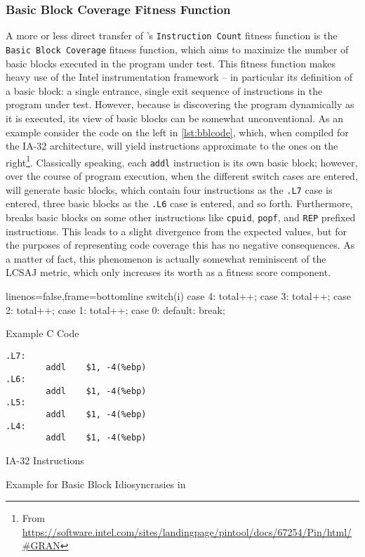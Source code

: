 \subsubsection{Basic Block Coverage Fitness Function}
A more or less direct transfer of \evosuite's \texttt{Instruction Count} fitness function is the 
\texttt{Basic Block Coverage} fitness function, which aims to maximize the number of basic blocks 
executed in the program under test. This fitness function makes heavy use of the {\small Intel} \pin
instrumentation framework -- in particular its definition of a basic block: a single entrance, 
single exit sequence of instructions in the program under test. However, because \pin is discovering the 
program dynamically as it is executed, its view of basic blocks can be somewhat unconventional. As an 
example consider the code on the left in \cref{lst:bblcode}, which, when compiled for the IA-32 
architecture, will yield instructions approximate to the ones on the 
right\footnote{From \url{https://software.intel.com/sites/landingpage/pintool/docs/67254/Pin/html/\#GRAN}}.
Classically speaking, each \texttt{addl} instruction is its own basic block; however, over the course
of program execution, when the different switch cases are entered, \pin will generate basic blocks, which
contain four instructions as the \texttt{.L7} case is entered, three basic blocks as the \texttt{.L6}
case is entered, and so forth. Furthermore, \pin breaks basic blocks on some other instructions like 
\texttt{cpuid}, \texttt{popf}, and \texttt{REP} prefixed instructions. This leads to a slight divergence 
from the expected values, but for the purposes of representing code coverage this has no negative 
consequences. As a matter of fact, this phenomenon is actually somewhat reminiscent of the LCSAJ
metric\cite{Hennell:1976:PA}, which only increases its worth as a fitness score component.
\begin{listing}[h]
\centering
\begin{minipage}[b]{0.49\textwidth}
	\centering
	\begin{ccode*}{linenos=false,frame=bottomline}
	switch(i) {
        case 4: total++;
        case 3: total++;
        case 2: total++;
        case 1: total++;
        case 0:
        default: break;
    	}
\end{ccode*}
	Example C Code
 \end{minipage}
%
 \begin{minipage}[b]{0.49\textwidth}
  \centering
  \begin{verbatim}
.L7:
        addl    $1, -4(%ebp)
.L6:
        addl    $1, -4(%ebp)
.L5:
        addl    $1, -4(%ebp)
.L4:
        addl    $1, -4(%ebp)
\end{verbatim}
  IA-32 Instructions
 \end{minipage}
 \caption{Example for Basic Block Idiosyncrasies in \pin}
 \label{lst:bblcode}
\end{listing}

